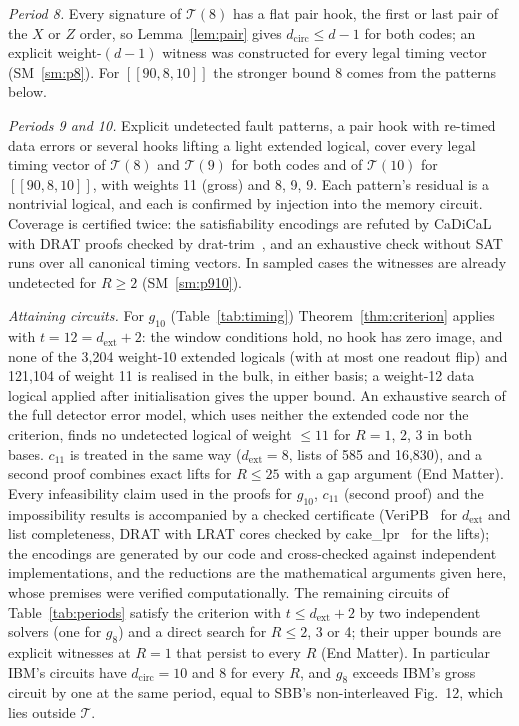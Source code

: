 \documentclass[aps,prl,twocolumn,superscriptaddress,nofootinbib]{revtex4-2}
\newcommand{\dcirc}{d_{\mathrm{circ}}}
\newcommand{\dext}{d_{\mathrm{ext}}}
\newcommand{\code}[1]{[[#1]]}
\newcommand{\T}{\mathcal{T}}
\begin{document}
\emph{Period 8.} Every signature of $\T(8)$ has a flat pair hook, the first or last pair
of the $X$ or $Z$ order, so Lemma~\ref{lem:pair} gives $\dcirc\le d-1$ for both codes; an
explicit weight-$(d-1)$ witness was constructed for every legal timing vector
(SM~\ref{sm:p8}). For $\code{90,8,10}$ the stronger bound 8 comes from the
patterns below.

\emph{Periods 9 and 10.} Explicit undetected fault patterns, a pair hook with re-timed data
errors or several hooks lifting a light extended logical, cover every legal timing vector
of $\T(8)$ and $\T(9)$ for both codes and of $\T(10)$ for $\code{90,8,10}$, with weights
11 (gross) and 8, 9, 9. Each pattern's residual is a nontrivial logical, and each is
confirmed by injection into the memory circuit. Coverage is certified twice: the
satisfiability encodings are refuted by CaDiCaL~\cite{CaDiCaL2024} with DRAT proofs checked
by drat-trim~\cite{DRATtrim2014}, and an
exhaustive check without SAT runs over all canonical timing vectors. In sampled cases the
witnesses are already undetected for $R\ge2$ (SM~\ref{sm:p910}).

\emph{Attaining circuits.} For $g_{10}$ (Table~\ref{tab:timing}) Theorem~\ref{thm:criterion}
applies with $t=12=\dext+2$: the window conditions hold, no hook has zero image, and none of
the 3,204 weight-10 extended logicals (with at most one readout flip) and 121,104 of weight
11 is realised in the bulk, in either basis; a weight-12 data logical applied after
initialisation gives the upper bound. An exhaustive search of the full detector error
model, which uses neither the extended code nor the criterion, finds no undetected logical
of weight $\le11$ for $R=1$, 2, 3 in both bases. $c_{11}$ is treated in the same way
($\dext=8$, lists of 585 and 16,830), and a second proof combines exact lifts for
$R\le25$ with a gap argument (End Matter). Every infeasibility claim used in the
proofs for $g_{10}$, $c_{11}$ (second proof) and the impossibility results is accompanied by a checked
certificate (VeriPB~\cite{Bogaerts2023,GochtNordstrom2021} for $\dext$ and list
completeness, DRAT with LRAT cores checked by cake\_lpr~\cite{Tan2021cakelpr} for the lifts); the encodings are generated by our code and cross-checked against
independent implementations, and the reductions are the mathematical arguments given here,
whose premises were verified computationally. The remaining circuits of
Table~\ref{tab:periods} satisfy the criterion with $t\le\dext+2$ by two independent solvers
(one for $g_8$) and a direct search for $R\le2$, 3 or 4; their upper bounds are explicit witnesses at $R=1$ that
persist to every $R$ (End Matter). In particular IBM's circuits have
$\dcirc=10$ and 8 for every $R$, and $g_8$ exceeds IBM's gross circuit by one at the same period, equal to
SBB's non-interleaved Fig.~12, which lies outside $\T$.
\end{document}
